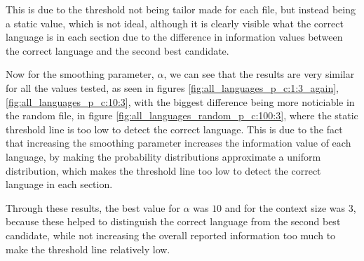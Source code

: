 \documentclass{article}
\begin{document}
This is due to the threshold not being tailor made for each file, but instead being a static value, which is not ideal, although it is clearly visible what the correct language is
in each section due to the difference in information values between the correct language and the second best candidate.

Now for the smoothing parameter, $\alpha$, we can see that the results are very similar for all the values tested, as seen in figures \ref{fig:all_languages_p_c:1:3_again}, \ref{fig:all_languages_p_c:10:3},
with the biggest difference being more noticiable in the random file, in figure \ref{fig:all_languages_random_p_c:100:3}, where the static threshold line is too low to detect the correct language.
This is due to the fact that increasing the smoothing parameter increases the information value of each language, by making the probability distributions approximate a uniform distribution, which makes the threshold line too low to detect the correct language in each section.

Through these results, the best value for $\alpha$ was $10$ and for the context size was $3$, because these helped to distinguish the correct language from the second best candidate, while not increasing the overall reported information too much to make the threshold line relatively low.
\end{document}
